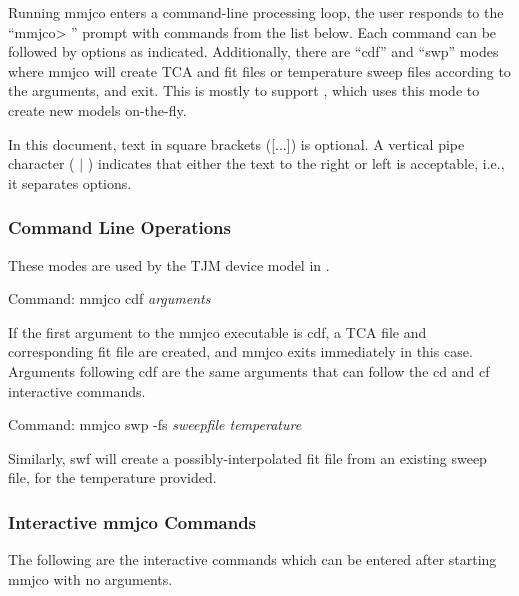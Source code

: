 Running {\vt mmjco} enters a command-line processing loop, the user
responds to the ``{\vt mmjco> }'' prompt with commands from the list
below.  Each command can be followed by options as indicated. 
Additionally, there are ``{\vt cdf}'' and ``{\vt swp}'' modes where
{\vt mmjco} will create TCA and fit files or temperature sweep files
according to the arguments, and exit.  This is mostly to support
{\WRspice}, which uses this mode to create new models on-the-fly.

In this document, text in square brackets ([...]) is optional.  A
vertical pipe character ( $|$ ) indicates that either the text to the
right or left is acceptable, i.e., it separates options.

\subsubsection{Command Line Operations}

These modes are used by the TJM device model in {\WRspice}.

Command:  {\vt mmjco cdf} {\it arguments}

If the first argument to the {\vt mmjco} executable is {\vt cdf}, a
TCA file and corresponding fit file are created, and {\vt mmjco} exits
immediately in this case.  Arguments following {\vt cdf} are the same
arguments that can follow the {\vt cd} and {\vt cf} interactive
commands.

Command:  {\vt mmjco swp -fs} {\it sweepfile temperature}

Similarly, {\vt swf} will create a possibly-interpolated fit file from
an existing sweep file, for the temperature provided.

\subsubsection{Interactive {\vt mmjco} Commands}

The following are the interactive commands which can be entered after
starting {\vt mmjco} with no arguments.

